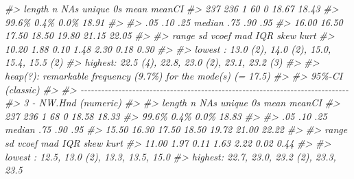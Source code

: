 \documentclass[
]{book}
\newenvironment{Shaded}{\begin{snugshade}}{\end{snugshade}}
\newcommand{\CommentTok}[1]{\textcolor[rgb]{0.56,0.35,0.01}{\textit{#1}}}
\begin{document}
\begin{Shaded}
\begin{Highlighting}[]
\CommentTok{\#\textgreater{}   length      n    NAs  unique     0s   mean  meanCI\textquotesingle{}}
\CommentTok{\#\textgreater{}      237    236      1      60      0  18.67   18.43}
\CommentTok{\#\textgreater{}           99.6\%   0.4\%           0.0\%          18.91}
\CommentTok{\#\textgreater{}                                                     }
\CommentTok{\#\textgreater{}      .05    .10    .25  median    .75    .90     .95}
\CommentTok{\#\textgreater{}    16.00  16.50  17.50   18.50  19.80  21.15   22.05}
\CommentTok{\#\textgreater{}                                                     }
\CommentTok{\#\textgreater{}    range     sd  vcoef     mad    IQR   skew    kurt}
\CommentTok{\#\textgreater{}    10.20   1.88   0.10    1.48   2.30   0.18    0.30}
\CommentTok{\#\textgreater{}                                                     }
\CommentTok{\#\textgreater{} lowest : 13.0 (2), 14.0 (2), 15.0, 15.4, 15.5 (2)}
\CommentTok{\#\textgreater{} highest: 22.5 (4), 22.8, 23.0 (2), 23.1, 23.2 (3)}
\CommentTok{\#\textgreater{} }
\CommentTok{\#\textgreater{} heap(?): remarkable frequency (9.7\%) for the mode(s) (= 17.5)}
\CommentTok{\#\textgreater{} }
\CommentTok{\#\textgreater{} \textquotesingle{} 95\%{-}CI (classic)}
\CommentTok{\#\textgreater{} }
\CommentTok{\#\textgreater{} {-}{-}{-}{-}{-}{-}{-}{-}{-}{-}{-}{-}{-}{-}{-}{-}{-}{-}{-}{-}{-}{-}{-}{-}{-}{-}{-}{-}{-}{-}{-}{-}{-}{-}{-}{-}{-}{-}{-}{-}{-}{-}{-}{-}{-}{-}{-}{-}{-}{-}{-}{-}{-}{-}{-}{-}{-}{-}{-}{-}{-}{-}{-}{-}{-}{-}{-}{-}{-}{-}{-}{-}{-}{-}{-}{-}{-}{-} }
\CommentTok{\#\textgreater{} 3 {-} NW.Hnd (numeric)}
\CommentTok{\#\textgreater{} }
\CommentTok{\#\textgreater{}   length      n    NAs  unique     0s   mean  meanCI\textquotesingle{}}
\CommentTok{\#\textgreater{}      237    236      1      68      0  18.58   18.33}
\CommentTok{\#\textgreater{}           99.6\%   0.4\%           0.0\%          18.83}
\CommentTok{\#\textgreater{}                                                     }
\CommentTok{\#\textgreater{}      .05    .10    .25  median    .75    .90     .95}
\CommentTok{\#\textgreater{}    15.50  16.30  17.50   18.50  19.72  21.00   22.22}
\CommentTok{\#\textgreater{}                                                     }
\CommentTok{\#\textgreater{}    range     sd  vcoef     mad    IQR   skew    kurt}
\CommentTok{\#\textgreater{}    11.00   1.97   0.11    1.63   2.22   0.02    0.44}
\CommentTok{\#\textgreater{}                                                     }
\CommentTok{\#\textgreater{} lowest : 12.5, 13.0 (2), 13.3, 13.5, 15.0}
\CommentTok{\#\textgreater{} highest: 22.7, 23.0, 23.2 (2), 23.3, 23.5}

\end{Highlighting}
\end{Shaded}
\end{document}
